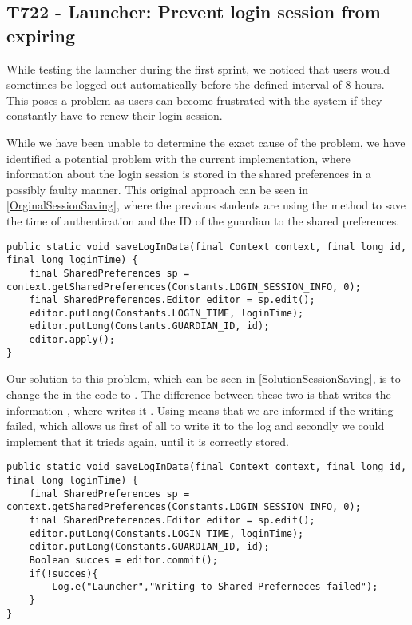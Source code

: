 \subsection{T722 - Launcher: Prevent login session from expiring}\label{T722}
While testing the launcher during the first sprint, we noticed that users would
sometimes be logged out automatically before the defined interval of 8
hours. This poses a problem as users can become frustrated with the system
if they constantly have to renew their login session.\nl

While we have been unable to determine the exact cause of the problem, we have
identified a potential problem with the current implementation, where
information about the login session is stored in the shared preferences in a
possibly faulty manner. This original approach can be seen in
\autoref{OrginalSessionSaving}, where the previous students are using the
 method to save the time of authentication
and the ID of the guardian to the shared preferences.\nl

\begin{minipage}[H]{\linewidth}
\begin{lstlisting}[caption = Original approach to saving login session, label =
OrginalSessionSaving]
public static void saveLogInData(final Context context, final long id, final long loginTime) {
    final SharedPreferences sp = context.getSharedPreferences(Constants.LOGIN_SESSION_INFO, 0);
    final SharedPreferences.Editor editor = sp.edit();
    editor.putLong(Constants.LOGIN_TIME, loginTime);
    editor.putLong(Constants.GUARDIAN_ID, id);
    editor.apply();
}
\end{lstlisting} 
\end{minipage}

Our solution to this problem, which can be seen in
\autoref{SolutionSessionSaving}, is to change the  in the code to
. The difference between these two is that
 writes the information , where 
writes it . Using  means that we are informed
if the writing failed, which allows us first of all to write it to the log and
secondly we could implement that it trieds again, until it is correctly
stored.\nl

\begin{minipage}[H]{\linewidth}
\begin{lstlisting}[caption = Our solution to saving login session, label
=SolutionSessionSaving ]
public static void saveLogInData(final Context context, final long id, final long loginTime) {
    final SharedPreferences sp = context.getSharedPreferences(Constants.LOGIN_SESSION_INFO, 0);
    final SharedPreferences.Editor editor = sp.edit();
    editor.putLong(Constants.LOGIN_TIME, loginTime);
    editor.putLong(Constants.GUARDIAN_ID, id);
    Boolean succes = editor.commit();
    if(!succes){
    	Log.e("Launcher","Writing to Shared Preferneces failed");
	}
} 
\end{lstlisting} 
\end{minipage}

